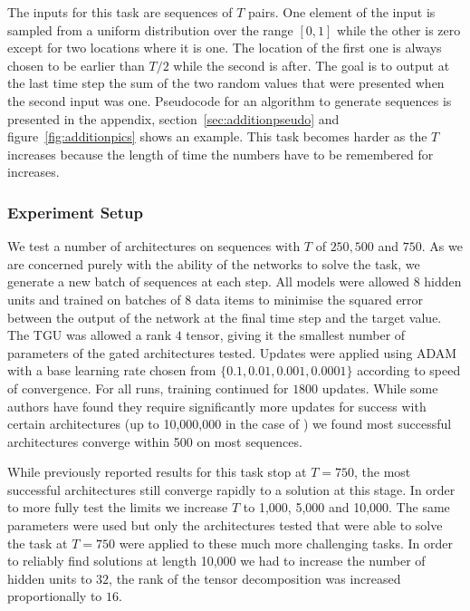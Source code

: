 The inputs for this task are sequences of \(T\) pairs. One element of the input is sampled from a uniform
distribution over the range \([0,1]\) while the other is zero except for two locations where it is one.
The location of the first one is always chosen to be earlier than \(T/2\) while the second is after.
The goal is to output at the last time step the sum of the two random values that were presented when the
second input was one. Pseudocode for an algorithm to generate sequences is presented in the appendix,
section~\ref{sec:additionpseudo} and figure~\ref{fig:additionpics} shows an example.
This task becomes harder as the \(T\) increases because the length of time the numbers have to
be remembered for increases.

\subsubsection{Experiment Setup}
We test a number of architectures on sequences with \(T\) of \(250, 500\) and \(750\). As we are
concerned purely with the ability of the networks to solve the task, we generate a new batch of
sequences at each step. All models were allowed \(8\) hidden units and trained on batches of \(8\)
data items to minimise the squared error between the output of the network at the final time step and
the target value. The TGU was allowed a rank \(4\) tensor, giving it the smallest number of parameters
of the gated architectures tested.
Updates were applied using ADAM \autocite{Kingma2014} with a base learning rate chosen
from \(\{0.1, 0.01, 0.001, 0.0001\}\) according to speed of convergence. For all runs, training continued
for \(1800\) updates. While some authors have found they require significantly more updates for success
with certain architectures (up to 10,000,000 in the case of \autocite{Le2015}) we found most successful
architectures converge within 500 on most sequences.

While previously reported results for this task stop at \(T=750\), the most successful architectures still
converge rapidly to a solution at this stage. In order to more fully test the limits we increase
\(T\) to 1,000, 5,000 and 10,000. The same parameters were used but only the architectures tested that
were able to solve the task at \(T=750\) were applied to these much more challenging tasks. In order
to reliably find solutions at length 10,000 we had to increase the number of hidden units to \(32\), the
rank of the tensor decomposition was increased proportionally to \(16\).


